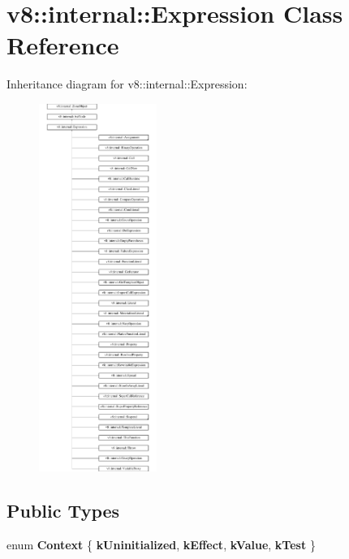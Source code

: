 \hypertarget{classv8_1_1internal_1_1Expression}{}\section{v8\+:\+:internal\+:\+:Expression Class Reference}
\label{classv8_1_1internal_1_1Expression}
Inheritance diagram for v8\+:\+:internal\+:\+:Expression\+:\begin{figure}[H]
\begin{center}
\leavevmode
\includegraphics[height=12.000000cm]{classv8_1_1internal_1_1Expression}
\end{center}
\end{figure}
\subsection*{Public Types}
\begin{DoxyCompactItemize}
\item 
\mbox{\label{classv8_1_1internal_1_1Expression_a04f7abd80505ef4b9e813324d2fb37a9}} 
enum {\bfseries Context} \{ {\bfseries k\+Uninitialized}, 
{\bfseries k\+Effect}, 
{\bfseries k\+Value}, 
{\bfseries k\+Test}
 \}
\end{DoxyCompactItemize}
